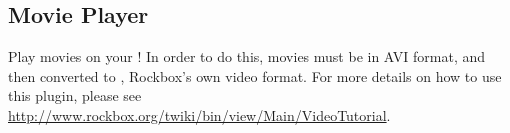 \subsection{Movie Player}
Play movies on your \dap!  In order to do this, movies must be in AVI format,
and then converted to , Rockbox's own video format. For more
details on how to use this plugin, please see
\url{http://www.rockbox.org/twiki/bin/view/Main/VideoTutorial}.
